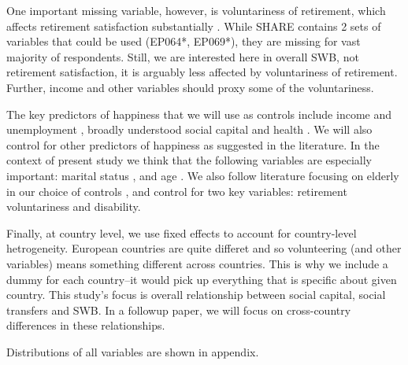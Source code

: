 \documentclass[10pt, letterpaper]{article}
\begin{document}
\begin{spacing}{1.4}
One important missing variable, however, is voluntariness of retirement, which
affects retirement satisfaction substantially \citep{bender12}. While SHARE
contains 2 sets of variables that could be used (EP064*, EP069*), they are
missing for vast majority of respondents. Still, we are interested here in
overall SWB, not retirement satisfaction, it is arguably less affected by
voluntariness of retirement. Further, income and other variables should proxy
some of the voluntariness.

The key predictors of happiness that we will use as controls include income and
unemployment \citep[][]{ditella01moa,ditella01mob,ditella06m}, broadly
understood social
capital and health \citep{blanchflower11,dolan08al,bonsang12}. %
We will also control for other predictors of happiness as suggested in the 
literature. In the context of present study we think that the following
variables are especially important: marital status \citep[e.g.,][]{myers00,diener04s}, and age \citep{ferring10}. 
%
We also follow literature focusing on elderly in our choice of controls
\citep[e.g.,][]{meier2008volunteering,bonsang12,bender12,ferring10}, and control
for two key variables:  retirement voluntariness and disability. 

Finally, at country level, we use fixed effects to account for country-level
hetrogeneity.
European countries are quite differet and so volunteering (and other variables) means something
different across countries.  This is why we include a dummy for each country--it would pick up
everything that is specific about given country. This study's focus is overall
relationship between social capital, social transfers and SWB. In a followup
paper, we will focus on cross-country differences in these relationships. 

Distributions of all variables are shown in appendix.


\end{spacing}
\end{document}
